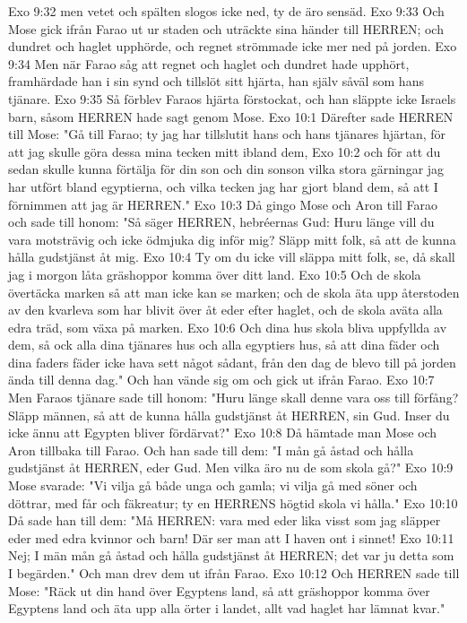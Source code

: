 Exo 9:32  men vetet och spälten slogos icke ned, ty de äro sensäd.
Exo 9:33  Och Mose gick ifrån Farao ut ur staden och uträckte sina händer till HERREN; och dundret och haglet upphörde, och regnet strömmade icke mer ned på jorden.
Exo 9:34  Men när Farao såg att regnet och haglet och dundret hade upphört, framhärdade han i sin synd och tillslöt sitt hjärta, han själv såväl som hans tjänare.
Exo 9:35  Så förblev Faraos hjärta förstockat, och han släppte icke Israels barn, såsom HERREN hade sagt genom Mose.
Exo 10:1  Därefter sade HERREN till Mose: "Gå till Farao; ty jag har tillslutit hans och hans tjänares hjärtan, för att jag skulle göra dessa mina tecken mitt ibland dem,
Exo 10:2  och för att du sedan skulle kunna förtälja för din son och din sonson vilka stora gärningar jag har utfört bland egyptierna, och vilka tecken jag har gjort bland dem, så att I förnimmen att jag är HERREN."
Exo 10:3  Då gingo Mose och Aron till Farao och sade till honom: "Så säger HERREN, hebréernas Gud: Huru länge vill du vara motsträvig och icke ödmjuka dig inför mig? Släpp mitt folk, så att de kunna hålla gudstjänst åt mig.
Exo 10:4  Ty om du icke vill släppa mitt folk, se, då skall jag i morgon låta gräshoppor komma över ditt land.
Exo 10:5  Och de skola övertäcka marken så att man icke kan se marken; och de skola äta upp återstoden av den kvarleva som har blivit över åt eder efter haglet, och de skola aväta alla edra träd, som växa på marken.
Exo 10:6  Och dina hus skola bliva uppfyllda av dem, så ock alla dina tjänares hus och alla egyptiers hus, så att dina fäder och dina faders fäder icke hava sett något sådant, från den dag de blevo till på jorden ända till denna dag." Och han vände sig om och gick ut ifrån Farao.
Exo 10:7  Men Faraos tjänare sade till honom: "Huru länge skall denne vara oss till förfång? Släpp männen, så att de kunna hålla gudstjänst åt HERREN, sin Gud. Inser du icke ännu att Egypten bliver fördärvat?"
Exo 10:8  Då hämtade man Mose och Aron tillbaka till Farao. Och han sade till dem: "I mån gå åstad och hålla gudstjänst åt HERREN, eder Gud. Men vilka äro nu de som skola gå?"
Exo 10:9  Mose svarade: "Vi vilja gå både unga och gamla; vi vilja gå med söner och döttrar, med får och fäkreatur; ty en HERRENS högtid skola vi hålla."
Exo 10:10  Då sade han till dem: "Må HERREN: vara med eder lika visst som jag släpper eder med edra kvinnor och barn! Där ser man att I haven ont i sinnet!
Exo 10:11  Nej; I män mån gå åstad och hålla gudstjänst åt HERREN; det var ju detta som I begärden." Och man drev dem ut ifrån Farao.
Exo 10:12  Och HERREN sade till Mose: "Räck ut din hand över Egyptens land, så att gräshoppor komma över Egyptens land och äta upp alla örter i landet, allt vad haglet har lämnat kvar."

